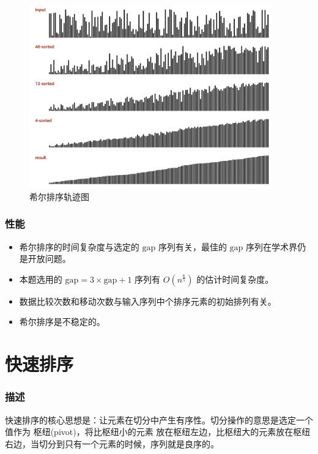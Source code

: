 \newpage

\begin{figure}[H]
    \centering
    \includegraphics[width=10.5cm]{src/shellTrace.png}
    \caption{希尔排序轨迹图}
\end{figure}

\subsubsection{性能}
\begin{itemize}
    \item 希尔排序的时间复杂度与选定的 $\text{gap}$ 序列有关，最佳的 $\text{gap}$ 序列在学术界仍是开放问题。
    \item 本题选用的 $\text{gap} = 3 \times \text{gap} + 1$ 序列有 $O(n^{\frac{6}{5}})$ 的估计时间复杂度。
    \item 数据比较次数和移动次数与输入序列中个排序元素的初始排列有关。
    \item 希尔排序是不稳定的。
\end{itemize}

\section{快速排序}

\subsubsection{描述}
快速排序的核心思想是：让元素在切分中产生有序性。{\kaishu 切分}操作的意思是选定一个值作为 {\kaishu 枢纽(pivot)}，将比枢纽小的元素%
放在枢纽左边，比枢纽大的元素放在枢纽右边，当切分到只有一个元素的时候，序列就是良序的。

\newpage

